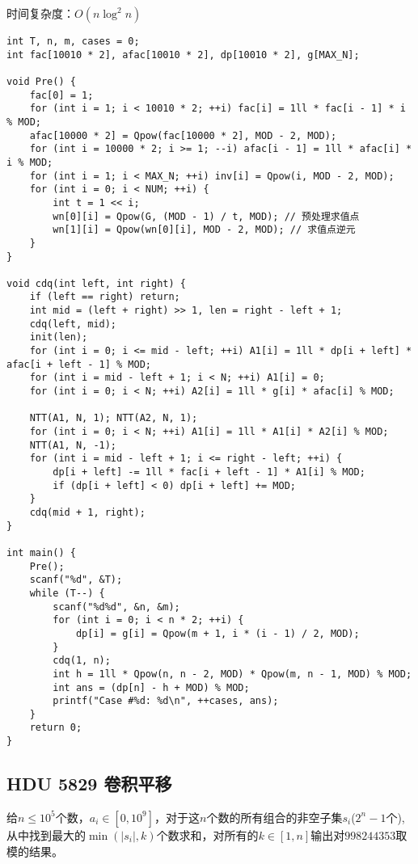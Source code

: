 时间复杂度：$O(n\log^2 n)$
\begin{lstlisting}
int T, n, m, cases = 0;
int fac[10010 * 2], afac[10010 * 2], dp[10010 * 2], g[MAX_N];

void Pre() {
    fac[0] = 1;
    for (int i = 1; i < 10010 * 2; ++i) fac[i] = 1ll * fac[i - 1] * i % MOD;
    afac[10000 * 2] = Qpow(fac[10000 * 2], MOD - 2, MOD);
    for (int i = 10000 * 2; i >= 1; --i) afac[i - 1] = 1ll * afac[i] * i % MOD;
    for (int i = 1; i < MAX_N; ++i) inv[i] = Qpow(i, MOD - 2, MOD);
    for (int i = 0; i < NUM; ++i) {
        int t = 1 << i;
        wn[0][i] = Qpow(G, (MOD - 1) / t, MOD); // 预处理求值点
        wn[1][i] = Qpow(wn[0][i], MOD - 2, MOD); // 求值点逆元
    }
}

void cdq(int left, int right) {
    if (left == right) return;
    int mid = (left + right) >> 1, len = right - left + 1;
    cdq(left, mid);
    init(len);
    for (int i = 0; i <= mid - left; ++i) A1[i] = 1ll * dp[i + left] * afac[i + left - 1] % MOD;
    for (int i = mid - left + 1; i < N; ++i) A1[i] = 0;
    for (int i = 0; i < N; ++i) A2[i] = 1ll * g[i] * afac[i] % MOD;

    NTT(A1, N, 1); NTT(A2, N, 1);
    for (int i = 0; i < N; ++i) A1[i] = 1ll * A1[i] * A2[i] % MOD;
    NTT(A1, N, -1);
    for (int i = mid - left + 1; i <= right - left; ++i) {
        dp[i + left] -= 1ll * fac[i + left - 1] * A1[i] % MOD;
        if (dp[i + left] < 0) dp[i + left] += MOD;
    }
    cdq(mid + 1, right);
}

int main() {
    Pre();
    scanf("%d", &T);
    while (T--) {
        scanf("%d%d", &n, &m);
        for (int i = 0; i < n * 2; ++i) {
            dp[i] = g[i] = Qpow(m + 1, i * (i - 1) / 2, MOD);
        }
        cdq(1, n);
        int h = 1ll * Qpow(n, n - 2, MOD) * Qpow(m, n - 1, MOD) % MOD;
        int ans = (dp[n] - h + MOD) % MOD;
        printf("Case #%d: %d\n", ++cases, ans);
    }
    return 0;
}
\end{lstlisting}
\subsection{HDU 5829 卷积平移}
给$n\leq 10^5$个数，$a_i\in [0, 10^9]$，对于这$n$个数的所有组合的非空子集$s_i$($2^{n}-1$个),从中找到最大的$\min(|s_i|,k)$个数求和，对所有的$k\in [1,n]$输出对$998244353$取模的结果。 \\

